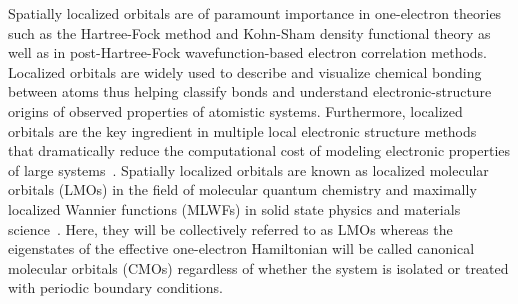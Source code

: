\documentclass[aps,prl,reprint,amsmath,amssymb]{revtex4-1}
\begin{document}
Spatially localized orbitals are of paramount importance in one-electron theories such as the Hartree-Fock method and Kohn-Sham density functional theory as well as in post-Hartree-Fock wavefunction-based electron correlation methods.
Localized orbitals are widely used to describe and visualize chemical bonding between atoms thus helping classify bonds and understand electronic-structure origins of observed properties of atomistic systems. 
Furthermore, localized orbitals are the key ingredient in multiple local electronic structure methods~\cite{goedecker1994efficient, bowler2012methods, zalesny2011linear, pulay1986orbital, saebo2001low, pisani2005local, hampel1996local, forner1997numerical} that dramatically reduce the computational cost of modeling electronic properties of large systems~\cite{saebo1993local, schutz1999low, hetzer2000low, schutz2001low}.
Spatially localized orbitals are known as localized molecular orbitals (LMOs) in the field of molecular quantum chemistry and maximally localized Wannier functions (MLWFs) in solid state physics and materials science~\cite{marzari2012maximally}. 
Here, they will be collectively referred to as LMOs whereas the eigenstates of the effective one-electron Hamiltonian will be called canonical molecular orbitals (CMOs) regardless of whether the system is isolated or treated with periodic boundary conditions.
\end{document}
